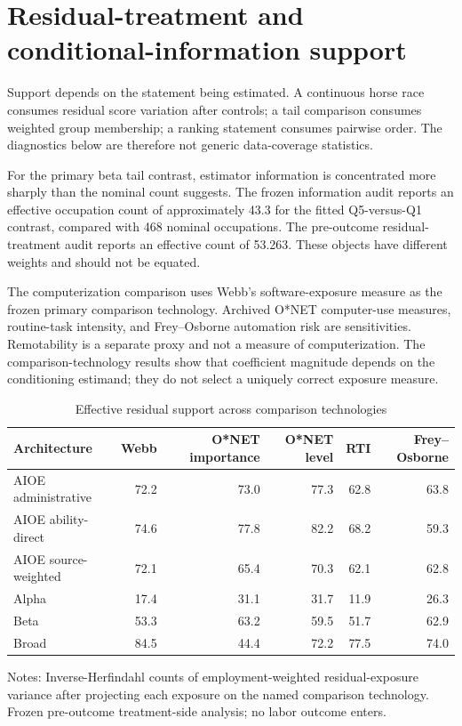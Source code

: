 \section{Residual-treatment and conditional-information support}\label{app:support}

Support depends on the statement being estimated. A continuous horse race consumes residual score variation after controls; a tail comparison consumes weighted group membership; a ranking statement consumes pairwise order. The diagnostics below are therefore not generic data-coverage statistics.

For the primary beta tail contrast, estimator information is concentrated more sharply than the nominal count suggests. The frozen information audit reports an effective occupation count of approximately 43.3 for the fitted Q5-versus-Q1 contrast, compared with 468 nominal occupations. The pre-outcome residual-treatment audit reports an effective count of 53.263. These objects have different weights and should not be equated.

The computerization comparison uses Webb's software-exposure measure as the frozen primary comparison technology. Archived O*NET computer-use measures, routine-task intensity, and Frey--Osborne automation risk are sensitivities. Remotability is a separate proxy and not a measure of computerization. The comparison-technology results show that coefficient magnitude depends on the conditioning estimand; they do not select a uniquely correct exposure measure.

\begin{table}[htbp]
\centering
\caption{Effective residual support across comparison technologies}
\label{tab:app-residualsupport}
\scriptsize
\setlength{\tabcolsep}{3pt}
\begin{threeparttable}
\begin{tabularx}{\textwidth}{Yrrrrr}
\toprule
Architecture & Webb & O*NET importance & O*NET level & RTI & Frey--Osborne\\
\midrule
AIOE administrative & 72.2 & 73.0 & 77.3 & 62.8 & 63.8\\
AIOE ability-direct & 74.6 & 77.8 & 82.2 & 68.2 & 59.3\\
AIOE source-weighted & 72.1 & 65.4 & 70.3 & 62.1 & 62.8\\
Alpha & 17.4 & 31.1 & 31.7 & 11.9 & 26.3\\
Beta & 53.3 & 63.2 & 59.5 & 51.7 & 62.9\\
Broad & 84.5 & 44.4 & 72.2 & 77.5 & 74.0\\
\bottomrule
\end{tabularx}
\begin{tablenotes}[flushleft]\footnotesize
\item Notes: Inverse-Herfindahl counts of employment-weighted residual-exposure variance after projecting each exposure on the named comparison technology. Frozen pre-outcome treatment-side analysis; no labor outcome enters.
\end{tablenotes}
\end{threeparttable}
\end{table}

